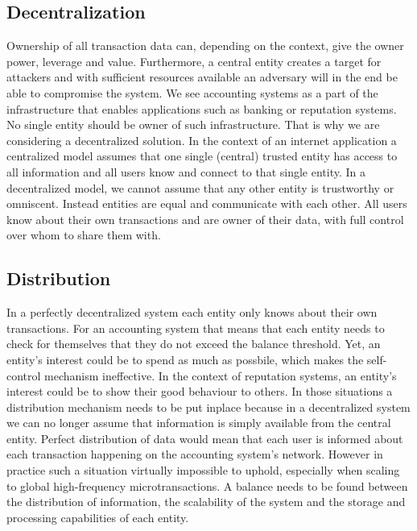 \subsection{Decentralization}
Ownership of all transaction data can, depending on the context, give the owner power, leverage and 
value. Furthermore, a central entity creates a target for attackers and with sufficient resources
available an adversary will in the end be able to compromise the system. We see accounting systems
as a part of the infrastructure that enables applications such as banking or reputation systems. No 
single entity should be owner of such infrastructure. That is why we are considering a decentralized
solution. In the context of an internet application a centralized model assumes that one single (central)
trusted entity has access to all information and all users know and connect to that single entity. In a 
decentralized model, we cannot assume that any other entity is trustworthy or omniscent. Instead entities
are equal and communicate with each other. All users know about their own transactions and are owner of
their data, with full control over whom to share them with. 

\subsection{Distribution}
In a perfectly decentralized system each entity only knows about their own transactions. For an 
accounting system that means that each entity needs to check for themselves that they do not exceed the
balance threshold. Yet, an entity's interest could be to spend as much as possbile, which makes the 
self-control mechanism ineffective. In the context of reputation systems, an entity's interest could be
to show their good behaviour to others. In those situations a distribution mechanism needs to be put 
inplace because in a decentralized system we can no longer assume that information is simply available from
the central entity. Perfect distribution of data would mean that each user is informed about each transaction
happening on the accounting system's network. However in practice such a situation virtually impossible to 
uphold, especially when scaling to global high-frequency microtransactions. A balance needs to be found 
between the distribution of information, the scalability of the system and the storage and processing 
capabilities of each entity.

